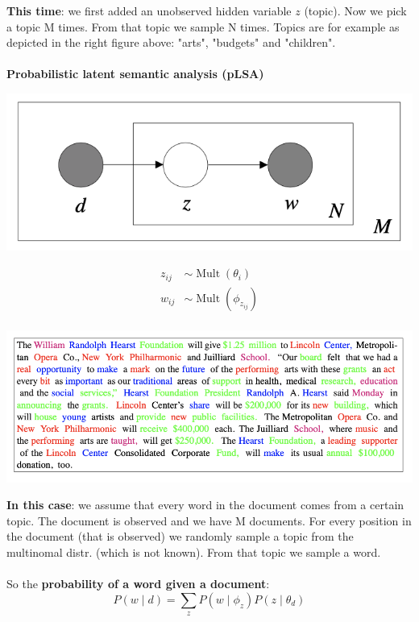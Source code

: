 \begin{enumerate}
    \textbf{This time}: we first added an unobserved hidden variable $z$ (topic). Now we pick a topic M times. From that topic we sample N times. Topics are for example as depicted in the right figure above: "arts", "budgets" and "children".  
    \\
    \\
    \textbf{\textcolor{Bittersweet}{Probabilistic latent semantic analysis (pLSA)}} \\
    \begin{minipage}{0.3\textwidth}
        \includegraphics[scale=0.3]{figures/uni3.png}
    \end{minipage}
    \begin{minipage}{0.2\textwidth}
        $$
        \begin{aligned}
        z_{ij} & \sim \operatorname{Mult}(\theta_i) \\
        w_{i j} & \sim \operatorname{Mult}\left(\phi_{z_{ij}}\right) \\
        &
        \end{aligned}
        $$
    \end{minipage}
    \begin{minipage}{0.5\textwidth}
        \;\;\; \includegraphics[scale=0.4]{figures/plsa.png}
    \end{minipage}
    
    \textbf{In this case}: we assume that every word in the document comes from a \textcolor{Bittersweet}{certain topic}. The document is observed and we have M documents. For every position in the document (that is observed) we randomly sample a topic from the multinomal distr. (which is not known). From that topic we sample a word. \\
    \\
    So the \textbf{probability of a word given a document}:
    $$
    P(w \mid d)=\sum_{z} P\left(w \mid \phi_{z}\right) P\left(z \mid \theta_{d}\right)
    $$
    

\end{enumerate}
